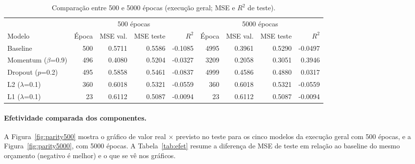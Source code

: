 \documentclass[11pt,a4paper]{article}
\begin{document}
\begin{table}[H]
\centering\footnotesize
\setlength{\tabcolsep}{4pt}
\caption{Comparação entre 500 e 5000 épocas (execução geral; MSE e $R^2$ de teste).}
\label{tab:destaque}
\begin{tabular}{lrrrr@{\hspace{12pt}}rrrr}
\toprule
 & \multicolumn{4}{c}{500 épocas} & \multicolumn{4}{c}{5000 épocas} \\
\cmidrule(lr){2-5}\cmidrule(lr){6-9}
Modelo & Época & MSE val. & MSE teste & $R^2$ & Época & MSE val. & MSE teste & $R^2$ \\
\midrule
Baseline & 500 & 0.5711 & 0.5586 & -0.1085 & 4995 & 0.3961 & 0.5290 & -0.0497 \\
Momentum ($\beta$=0.9) & 496 & 0.4080 & 0.5204 & -0.0327 & 3209 & 0.2058 & 0.3051 & 0.3946 \\
Dropout ($p$=0.2) & 495 & 0.5858 & 0.5461 & -0.0837 & 4999 & 0.4586 & 0.4880 & 0.0317 \\
L2 ($\lambda$=0.1) & 360 & 0.6018 & 0.5321 & -0.0559 & 360 & 0.6018 & 0.5321 & -0.0559 \\
L1 ($\lambda$=0.1) & 23 & 0.6112 & 0.5087 & -0.0094 & 23 & 0.6112 & 0.5087 & -0.0094 \\
\bottomrule
\end{tabular}
\end{table}

\paragraph{Efetividade comparada dos componentes.} A Figura~\ref{fig:parity500} mostra o gráfico de valor real $\times$ previsto no teste para os cinco modelos da execução geral com 500 épocas, e a Figura~\ref{fig:parity5000}, com 5000 épocas. A Tabela~\ref{tab:efet} resume a diferença de MSE de teste em relação ao baseline do mesmo orçamento (negativo é melhor) e o que se vê nos gráficos.
\end{document}
